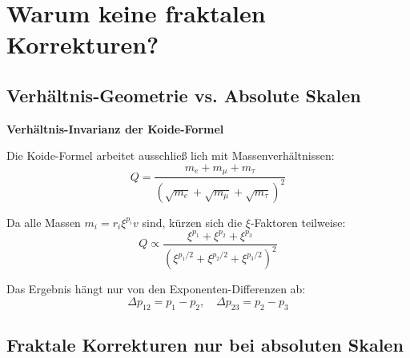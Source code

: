 	\section{Warum keine fraktalen Korrekturen?}
	
	\subsection{Verhältnis-Geometrie vs. Absolute Skalen}
	
	\begin{theorem}
		\textbf{Verhältnis-Invarianz der Koide-Formel}
		
		Die Koide-Formel arbeitet ausschließ lich mit Massenverhältnissen:
		\begin{equation}
			Q = \frac{m_e + m_\mu + m_\tau}{(\sqrt{m_e} + \sqrt{m_\mu} + \sqrt{m_\tau})^2}
		\end{equation}
		
		Da alle Massen $m_i = r_i \xi^{p_i} v$ sind, kürzen sich die $\xi$-Faktoren teilweise:
		\begin{equation}
			Q \propto \frac{\xi^{p_1} + \xi^{p_2} + \xi^{p_3}}{(\xi^{p_1/2} + \xi^{p_2/2} + \xi^{p_3/2})^2}
		\end{equation}
		
		Das Ergebnis hängt nur von den Exponenten-Differenzen ab:
		\begin{equation}
			\Delta p_{12} = p_1 - p_2, \quad \Delta p_{23} = p_2 - p_3
		\end{equation}
	\end{theorem}
	
	\subsection{Fraktale Korrekturen nur bei absoluten Skalen}
	
	\begin{table}[h]
		\centering
		\caption{Notwendigkeit fraktaler Korrekturen}
	\end{table}
	
